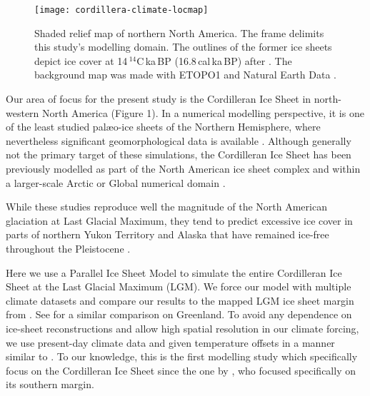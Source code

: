 \begin{figure}[t]
	\vspace*{2mm}
	\begin{center}
		\texttt{[image: cordillera-climate-locmap]}
	\end{center}
	\caption{Shaded relief map of northern North America. The frame delimits this study's modelling domain. The outlines of the former ice sheets depict ice cover at 14\,$^{14}$C\,ka\,BP (16.8\,cal\,ka\,BP) after \citet{dyke-2004}. The background map was made with ETOPO1 \citep{data:etopo1} and Natural Earth Data \citep{data:naturalearth}.}
	\label{fig:locmap}
\end{figure}

Our area of focus for the present study is the Cordilleran Ice Sheet in north-western North America (Figure 1). In a numerical modelling perspective, it is one of the least studied palæo-ice sheets of the Northern Hemisphere, where nevertheless significant geomorphological data is available \citep{jackson-clague-1991}. Although generally not the primary target of these simulations, the Cordilleran Ice Sheet has been previously modelled as part of the North American ice sheet complex \citep{marshall-clarke-1999,calov-etal-2002,tarasov-peltier-2004,bintanja-etal-2005,gregoire-etal-2012} and within a larger-scale Arctic or Global numerical domain \citep{huybrechts-tsiobbel-1996,charbit-etal-2002,johnson-fastook-2002,zweck-huybrechts-2005,abeouchi-etal-2007,charbit-etal-2013}.

While these studies reproduce well the magnitude of the North American glaciation at Last Glacial Maximum, they tend to predict excessive ice cover in parts of northern Yukon Territory and Alaska that have remained ice-free throughout the Pleistocene \citep{dukrodkin-1999,kaufman-manley-2004}.

Here we use a Parallel Ice Sheet Model \citep[PISM,][]{web:pism} to simulate the entire Cordilleran Ice Sheet at the Last Glacial Maximum (LGM). We force our model with multiple climate datasets and compare our results to the mapped LGM ice sheet margin from \citet{dyke-2004}. See \citet{quiquet-etal-2012} for a similar comparison on Greenland. To avoid any dependence on ice-sheet reconstructions and allow high spatial resolution in our climate forcing, we use present-day climate data and given temperature offsets in a manner similar to \citet{bintanja-etal-2005}. To our knowledge, this is the first modelling study which specifically focus on the Cordilleran Ice Sheet since the one by \citep{robert-1991}, who focused specifically on its southern margin.

